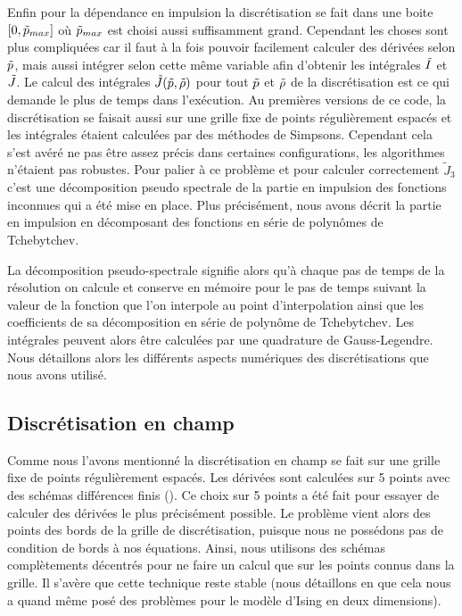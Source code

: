 \documentclass[10pt]{article}
\begin{document}
\begin{multicols}{2}
Enfin pour la dépendance en impulsion la discrétisation se fait dans une boite $[0, \tilde{p}_{max}]$ où $\tilde{p}_{max}$ est choisi aussi suffisamment grand. Cependant les choses sont plus compliquées car il faut à la fois pouvoir facilement calculer des dérivées selon $\tilde{p}$, mais aussi intégrer selon cette même variable afin d'obtenir les intégrales $\tilde{I}$ et $\tilde{J}$.  Le calcul des intégrales $\tilde{J}(\tilde{p}, \tilde{\rho})$ pour tout $\tilde{p}$ et $\tilde{\rho}$ de la discrétisation est ce qui demande le plus de temps dans l'exécution. Au premières versions de ce code, la discrétisation se faisait aussi sur une grille fixe de points régulièrement espacés et les intégrales étaient calculées par des méthodes de Simpsons. Cependant cela s'est avéré ne pas être assez précis dans certaines configurations, les algorithmes n'étaient pas robustes. Pour palier à ce problème et pour calculer correctement $\tilde J_3$ c'est une décomposition pseudo spectrale de la partie en impulsion des fonctions inconnues qui a été mise en place. Plus précisément, nous avons décrit la partie en impulsion en décomposant des fonctions en série de polynômes de Tchebytchev. 

La décomposition pseudo-spectrale signifie alors qu'à chaque pas de temps de la résolution on calcule et conserve en mémoire pour le pas de temps suivant la valeur de la fonction que l'on interpole au point d'interpolation ainsi que les coefficients de sa décomposition en série de polynôme de Tchebytchev. Les intégrales peuvent alors être calculées par une quadrature de Gauss-Legendre. \\

Nous détaillons alors les différents aspects numériques des discrétisations que nous avons utilisé.




\subsection{Discrétisation en champ}

Comme nous l'avons mentionné la discrétisation en champ se fait sur une grille fixe de points régulièrement espacés. Les dérivées sont calculées sur 5 points avec des schémas différences finis (). Ce choix sur 5 points  a été fait pour essayer de calculer des dérivées le plus précisément possible. Le problème vient alors des points des bords de la grille de discrétisation, puisque nous ne possédons pas de condition de bords à nos équations. Ainsi, nous utilisons des schémas complètements décentrés pour ne faire un calcul que sur les points connus dans la grille. Il s'avère que cette technique reste stable (nous détaillons en  que cela nous a quand même posé des problèmes pour le modèle d'Ising en deux dimensions). \\


\end{multicols}
\end{document}
